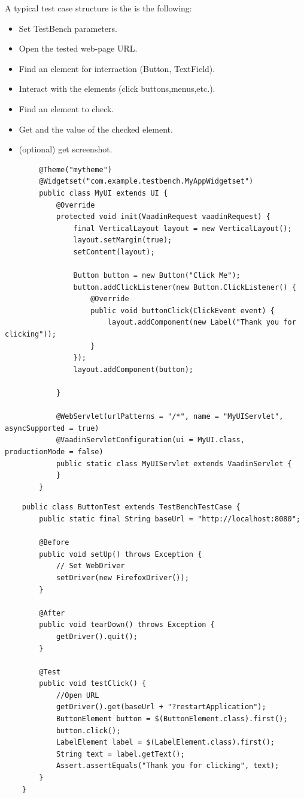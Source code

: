 \documentclass{article}
\begin{document}
A typical test case structure is the is the following:
\begin{itemize}
  \item Set TestBench parameters.
  \item Open the tested web-page URL.
  \item Find an element for interraction (Button, TextField).
  \item Interact with the elements (click buttons,menus,etc.).
  \item Find an element to check.
  \item Get and the value of the checked element.
  \item (optional) get screenshot.
\end{itemize}
	\lstset{language=Java}
	\begin{lstlisting}
		@Theme("mytheme")
		@Widgetset("com.example.testbench.MyAppWidgetset")
		public class MyUI extends UI {
		    @Override
		    protected void init(VaadinRequest vaadinRequest) {
		        final VerticalLayout layout = new VerticalLayout();
		        layout.setMargin(true);
		        setContent(layout);
		
		        Button button = new Button("Click Me");
		        button.addClickListener(new Button.ClickListener() {
		            @Override
		            public void buttonClick(ClickEvent event) {
		                layout.addComponent(new Label("Thank you for clicking"));
		            }
		        });
		        layout.addComponent(button);
		
		    }
		
		    @WebServlet(urlPatterns = "/*", name = "MyUIServlet", asyncSupported = true)
		    @VaadinServletConfiguration(ui = MyUI.class, productionMode = false)
		    public static class MyUIServlet extends VaadinServlet {
		    }
		}
	\end{lstlisting}
	\lstset{language=Java}
	\begin{lstlisting}
	public class ButtonTest extends TestBenchTestCase {
	    public static final String baseUrl = "http://localhost:8080";
	
	    @Before
	    public void setUp() throws Exception {
	        // Set WebDriver
	        setDriver(new FirefoxDriver());
	    }
	
	    @After
	    public void tearDown() throws Exception {
	        getDriver().quit();
	    }
	
	    @Test
	    public void testClick() {
	    	//Open URL
	        getDriver().get(baseUrl + "?restartApplication");
	        ButtonElement button = $(ButtonElement.class).first();
	        button.click();
	        LabelElement label = $(LabelElement.class).first();
	        String text = label.getText();
	        Assert.assertEquals("Thank you for clicking", text);
	    }
	}
	\end{lstlisting}
	
\end{document}
